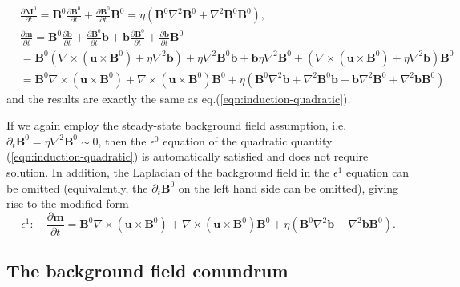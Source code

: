 \[\begin{aligned}
    &\frac{\partial \mathbf{M}^0}{\partial t} = \mathbf{B}^0 \frac{\partial \mathbf{B}^0}{\partial t} + \frac{\partial \mathbf{B}^0}{\partial t} \mathbf{B}^0 = \eta \left(\mathbf{B}^0 \nabla^2 \mathbf{B}^0 + \nabla^2 \mathbf{B}^0 \mathbf{B}^0\right),\\
    &\frac{\partial \mathbf{m}}{\partial t} = \mathbf{B}^0 \frac{\partial \mathbf{b}}{\partial t} + \frac{\partial \mathbf{B}^0}{\partial t} \mathbf{b} + \mathbf{b} \frac{\partial \mathbf{B}^0}{\partial t} + \frac{\partial \mathbf{b}}{\partial t} \mathbf{B}^0 \\
    &= \mathbf{B}^0 \left(\nabla\times (\mathbf{u}\times \mathbf{B}^0) + \eta \nabla^2 \mathbf{b}\right) + \eta \nabla^2 \mathbf{B}^0 \mathbf{b} + \mathbf{b} \eta \nabla^2 \mathbf{B}^0 + \left(\nabla\times (\mathbf{u}\times \mathbf{B}^0) + \eta \nabla^2 \mathbf{b}\right) \mathbf{B}^0 \\ 
    &= \mathbf{B}^0 \nabla\times (\mathbf{u}\times \mathbf{B}^0) + \nabla\times (\mathbf{u}\times \mathbf{B}^0) \mathbf{B}^0 + \eta \left(\mathbf{B}^0 \nabla^2 \mathbf{b} + \nabla^2 \mathbf{B}^0 \mathbf{b} + \mathbf{b}\nabla^2 \mathbf{B}^0 + \nabla^2 \mathbf{b} \mathbf{B}^0\right)
\end{aligned}\]
and the results are exactly the same as eq.(\ref{eqn:induction-quadratic}).

If we again employ the steady-state background field assumption, i.e. $\partial_t \mathbf{B}^0 = \eta \nabla^2 \mathbf{B}^0 \sim 0$, then the $\epsilon^0$ equation of the quadratic quantity (\ref{eqn:induction-quadratic}) is automatically satisfied and does not require solution. In addition, the Laplacian of the background field in the $\epsilon^1$ equation can be omitted (equivalently, the $\partial_t \mathbf{B}^0$ on the left hand side can be omitted), giving rise to the modified form
\begin{equation}\label{eqn:induction-quadratic-steady-bg}
    \epsilon^1:\quad \frac{\partial \mathbf{m}}{\partial t} = \mathbf{B}^0 \nabla\times (\mathbf{u}\times \mathbf{B}^0) + \nabla\times (\mathbf{u}\times \mathbf{B}^0) \mathbf{B}^0 + \eta \left(\mathbf{B}^0 \nabla^2 \mathbf{b} + \nabla^2 \mathbf{b} \mathbf{B}^0\right).
\end{equation}

\subsection{The background field conundrum}

